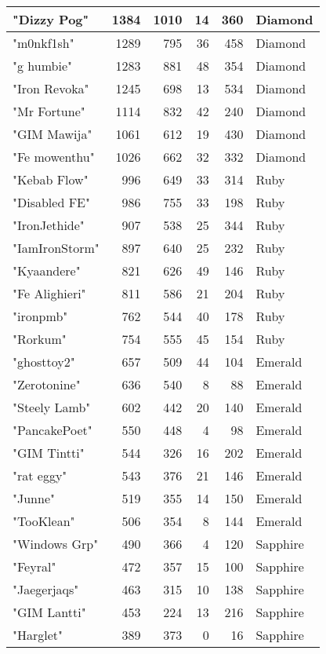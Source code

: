 \documentclass{article}
\begin{document}
\begin{table}[htbp]
\begin{tabular}{|l|r|r|r|r|l|}
"Dizzy Pog" & 1384 & 1010 & 14 & 360 & Diamond \\ \hline
"m0nkf1sh" & 1289 & 795 & 36 & 458 & Diamond \\ \hline
"g humbie" & 1283 & 881 & 48 & 354 & Diamond \\ \hline
"Iron Revoka" & 1245 & 698 & 13 & 534 & Diamond \\ \hline
"Mr Fortune" & 1114 & 832 & 42 & 240 & Diamond \\ \hline
"GIM Mawija" & 1061 & 612 & 19 & 430 & Diamond \\ \hline
"Fe mowenthu" & 1026 & 662 & 32 & 332 & Diamond \\ \hline
"Kebab Flow" & 996 & 649 & 33 & 314 & Ruby \\ \hline
"Disabled FE" & 986 & 755 & 33 & 198 & Ruby \\ \hline
"IronJethide" & 907 & 538 & 25 & 344 & Ruby \\ \hline
"IamIronStorm" & 897 & 640 & 25 & 232 & Ruby \\ \hline
"Kyaandere" & 821 & 626 & 49 & 146 & Ruby \\ \hline
"Fe Alighieri" & 811 & 586 & 21 & 204 & Ruby \\ \hline
"ironpmb" & 762 & 544 & 40 & 178 & Ruby \\ \hline
"Rorkum" & 754 & 555 & 45 & 154 & Ruby \\ \hline
"ghosttoy2" & 657 & 509 & 44 & 104 & Emerald \\ \hline
"Zerotonine" & 636 & 540 & 8 & 88 & Emerald \\ \hline
"Steely Lamb" & 602 & 442 & 20 & 140 & Emerald \\ \hline
"PancakePoet" & 550 & 448 & 4 & 98 & Emerald \\ \hline
"GIM Tintti" & 544 & 326 & 16 & 202 & Emerald \\ \hline
"rat eggy" & 543 & 376 & 21 & 146 & Emerald \\ \hline
"Junne" & 519 & 355 & 14 & 150 & Emerald \\ \hline
"TooKlean" & 506 & 354 & 8 & 144 & Emerald \\ \hline
"Windows Grp" & 490 & 366 & 4 & 120 & Sapphire \\ \hline
"Feyral" & 472 & 357 & 15 & 100 & Sapphire \\ \hline
"Jaegerjaqs" & 463 & 315 & 10 & 138 & Sapphire \\ \hline
"GIM Lantti" & 453 & 224 & 13 & 216 & Sapphire \\ \hline
"Harglet" & 389 & 373 & 0 & 16 & Sapphire \\ \hline

\end{tabular}
\end{table}
\end{document}
